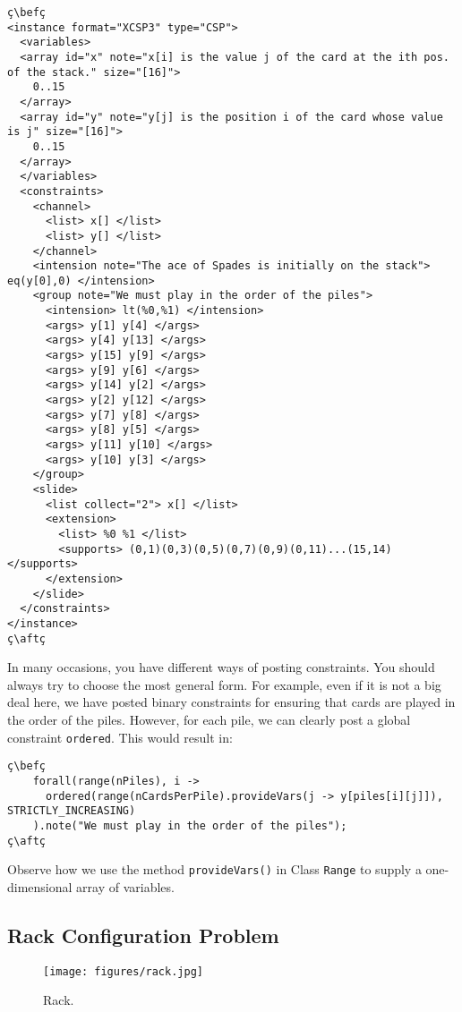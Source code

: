 \documentclass[10pt]{article}
\newcommand{\gb}[1]{{\tt #1}} %
\newcommand{\nn}[1]{{\tt #1}} %
\def\bef{\rule{10cm}{0.1mm}} %
\def\aft{\rule{10cm}{0.1mm}\medskip}
\begin{document}
\begin{lstlisting}
ç\befç
<instance format="XCSP3" type="CSP">
  <variables>
  <array id="x" note="x[i] is the value j of the card at the ith pos. of the stack." size="[16]">
    0..15
  </array>
  <array id="y" note="y[j] is the position i of the card whose value is j" size="[16]">
    0..15
  </array>
  </variables>
  <constraints>
    <channel>
      <list> x[] </list>
      <list> y[] </list>
    </channel>
    <intension note="The ace of Spades is initially on the stack"> eq(y[0],0) </intension>
    <group note="We must play in the order of the piles">
      <intension> lt(%0,%1) </intension>
      <args> y[1] y[4] </args>
      <args> y[4] y[13] </args>
      <args> y[15] y[9] </args>
      <args> y[9] y[6] </args>
      <args> y[14] y[2] </args>
      <args> y[2] y[12] </args>
      <args> y[7] y[8] </args>
      <args> y[8] y[5] </args>
      <args> y[11] y[10] </args>
      <args> y[10] y[3] </args>
    </group>
    <slide>
      <list collect="2"> x[] </list>
      <extension>
        <list> %0 %1 </list>
        <supports> (0,1)(0,3)(0,5)(0,7)(0,9)(0,11)...(15,14) </supports>
      </extension>
    </slide>
  </constraints>
</instance>
ç\aftç
\end{lstlisting}  

In many occasions, you have different ways of posting constraints.
You should always try to choose the most general form.
For example, even if it is not a big deal here, we have posted binary constraints for ensuring that cards are played in the order of the piles.
However, for each pile, we can clearly post a global constraint \gb{ordered}.
This would result in:

\begin{lstlisting}
ç\befç
    forall(range(nPiles), i ->
      ordered(range(nCardsPerPile).provideVars(j -> y[piles[i][j]]), STRICTLY_INCREASING)
    ).note("We must play in the order of the piles");
ç\aftç
\end{lstlisting}  
Observe how we use the method \nn{provideVars()} in Class \nn{Range} to supply a one-dimensional array of variables.


\subsection{Rack Configuration Problem}

\begin{figure}[h]
\begin{center}
  \texttt{[image: figures/rack.jpg]}
\end{center}
\caption{Rack.\label{fig:rack}}
\end{figure}
\end{document}
